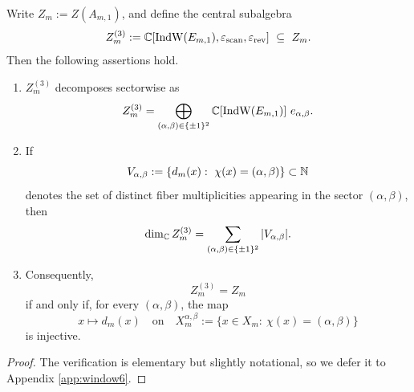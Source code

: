 \begin{proposition}\label{prop:fold-center-resolution-criterion-indw-eps}
Write \(Z_m:=Z(A_{m,1})\), and define the central subalgebra
\[
Z_m^{(3)}:=\CC\!\left[\mathrm{IndW}(E_{m,1}),\varepsilon_{\mathrm{scan}},\varepsilon_{\mathrm{rev}}\right]\ \subseteq\ Z_m.
\]
Then the following assertions hold.
\begin{enumerate}
\normalfont
  \item \(Z_m^{(3)}\) decomposes sectorwise as
  \[
  Z_m^{(3)}
  =
  \bigoplus_{(\alpha,\beta)\in\{\pm1\}^2}\mathbb{C}\!\left[\mathrm{IndW}(E_{m,1})\right]\,e_{\alpha,\beta}.
  \]
  \item If
  \[
  V_{\alpha,\beta}:=\{d_m(x):\ \chi(x)=(\alpha,\beta)\}\subset\NN
  \]
  denotes the set of distinct fiber multiplicities appearing in the sector \((\alpha,\beta)\), then
  \[
  \dim_{\mathbb{C}}Z_m^{(3)}=\sum_{(\alpha,\beta)\in\{\pm1\}^2}|V_{\alpha,\beta}|.
  \]
  \item Consequently,
  \[
  Z_m^{(3)}=Z_m
  \]
  if and only if, for every \((\alpha,\beta)\), the map
  \[
  x\longmapsto d_m(x)
  \quad\text{on}\quad
  X_m^{\alpha,\beta}:=\{x\in X_m:\ \chi(x)=(\alpha,\beta)\}
  \]
  is injective.
\end{enumerate}
\end{proposition}
\begin{proof}
The verification is elementary but slightly notational, so we defer it to Appendix \ref{app:window6}.
\end{proof}

